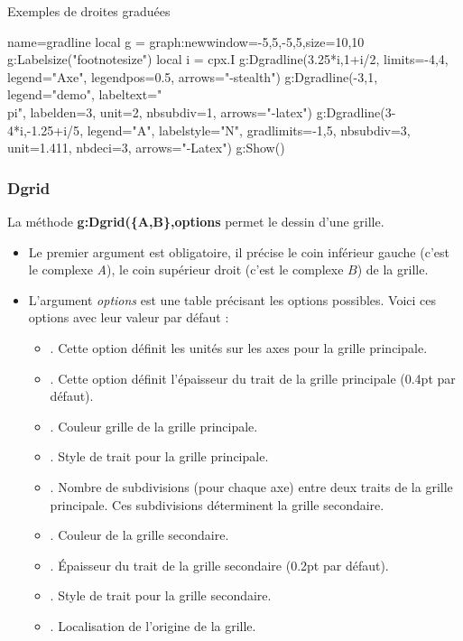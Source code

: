 \begin{demo}{Exemples de droites graduées}
\begin{luadraw}{name=gradline}
local g = graph:new{window={-5,5,-5,5},size={10,10}}
g:Labelsize("footnotesize")
local i = cpx.I
g:Dgradline({3.25*i,1+i/2}, {limits={-4,4}, legend="Axe", legendpos=0.5, arrows="-stealth"})
g:Dgradline({-3,1}, {legend="demo", labeltext="\\pi", labelden=3, unit=2, nbsubdiv=1, arrows="-latex"})
g:Dgradline({3-4*i,-1.25+i/5}, {legend="A", labelstyle="N", gradlimits={-1,5}, nbsubdiv=3, unit=1.411, nbdeci=3, arrows="-Latex"})
g:Show()
\end{luadraw}
\end{demo}

\subsubsection{Dgrid}

La méthode \textbf{g:Dgrid(\{A,B\},options} permet le dessin d'une grille.
\begin{itemize}
    \item Le premier argument est obligatoire, il précise le coin inférieur gauche (c'est le complexe \emph{A}), le coin supérieur droit (c'est le complexe $B$) de la grille.
    \item L'argument \emph{options} est une table précisant les options possibles. Voici ces options avec leur valeur par défaut :
        \begin{itemize}
            \item {}. Cette option définit les unités sur les axes pour la grille principale.
            \item {}. Cette option définit l'épaisseur du trait de la grille principale (0.4pt par défaut).
            \item {}. Couleur grille de la grille principale.
            \item {}. Style de trait pour la grille principale.
            \item {}. Nombre de subdivisions (pour chaque axe) entre deux traits de la grille principale. Ces subdivisions déterminent la grille secondaire.
            \item {}. Couleur de la grille secondaire.
            \item {}. Épaisseur du trait de la grille secondaire (0.2pt par défaut).
            \item {}. Style de trait pour la grille secondaire.
            \item {}. Localisation de l'origine de la grille.
        \end{itemize}
\end{itemize}

